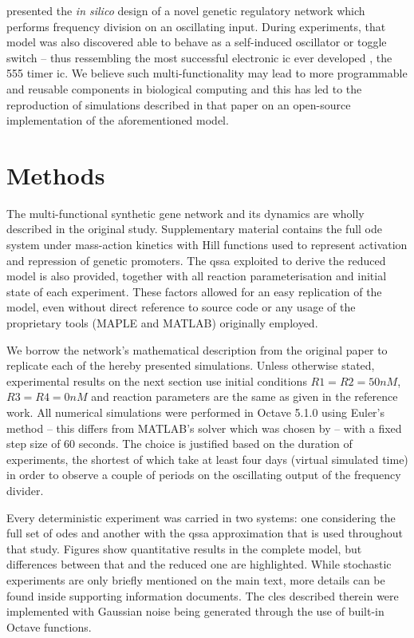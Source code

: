   \citet{multif} presented the \textit{in silico} design of a novel genetic regulatory network which performs frequency division on an oscillating input.
  During experiments, that model was also discovered able to behave as a self-induced oscillator or toggle switch -- thus ressembling the most successful electronic \ac{ic} ever developed \cite{ic555}, the 555 timer \acs{ic}.
  We believe such multi-functionality may lead to more programmable and reusable components in biological computing and this has led to the reproduction of simulations described in that paper on an open-source implementation of the aforementioned model.


\section{Methods}

  The multi-functional synthetic gene network and its dynamics are wholly described in the original study.
  Supplementary material contains the full \ac{ode} system under mass-action kinetics with Hill functions used to represent activation and repression of genetic promoters.
  The \ac{qssa} exploited to derive the reduced model is also provided, together with all reaction parameterisation and initial state of each experiment.
  These factors allowed for an easy replication of the model, even without direct reference to source code or any usage of the proprietary tools (MAPLE and MATLAB) originally employed.

  We borrow the network's mathematical description from the original paper to replicate each of the hereby presented simulations.
  Unless otherwise stated, experimental results on the next section use initial conditions $R1 = R2 = 50nM$, $R3 = R4 = 0nM$ and reaction parameters are the same as given in the reference work.
  All numerical simulations were performed in Octave 5.1.0 using Euler's method -- this differs from MATLAB's  solver which was chosen by \citet{multif} -- with a fixed step size of $60$ seconds.
  The choice is justified based on the duration of experiments, the shortest of which take at least four days (virtual simulated time) in order to observe a couple of periods on the oscillating output of the frequency divider.

  Every deterministic experiment was carried in two systems: one considering the full set of \ac{ode}s and another with the \ac{qssa} approximation that is used throughout that study.
  Figures show quantitative results in the complete model, but differences between that and the reduced one are highlighted.
  While stochastic experiments are only briefly mentioned on the main text, more details can be found inside supporting information documents.
  The \ac{cles} described therein were implemented with Gaussian noise being generated through the use of built-in Octave functions.

